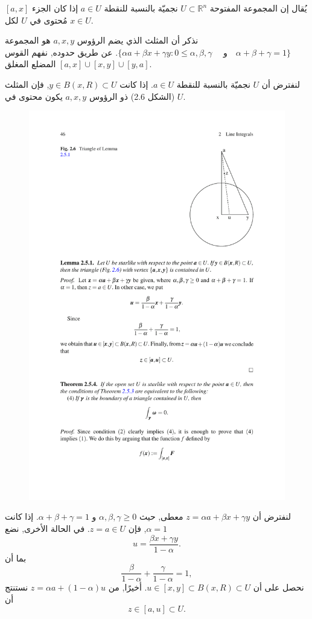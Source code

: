 \begin{definition}
يُقال إن المجموعة المفتوحة \( U \subset \mathbb{R}^n \) نجميّة بالنسبة للنقطة \( a \in U \) إذا كان الجزء \([a, x]\) مُحتوى في \( U \) لكل \( x \in U \).
\end{definition}

نذكر أن المثلث الذي يضم الرؤوس \( a, x, y \) هو المجموعة \(\{\alpha a + \beta x + \gamma y : 0 \leq \alpha, \beta, \gamma \quad\text{ و}\quad \alpha + \beta + \gamma = 1 \}\). عن طريق حدوده, نفهم القوس المضلع المغلق $[a, x] \cup  [x, y] \cup  [y, a]$.

\begin{lemma}
لنفترض أن \( U \) نجميّة بالنسبة للنقطة \( a \in U \). إذا كانت \( y \in B(x, R) \subset U \), فإن المثلث (الشكل 2.6) ذو الرؤوس \( a, x, y \) يكون محتوى في \( U \).
\end{lemma}

\begin{figure}
    \centering
    \includegraphics[width=0.5\linewidth]{Triangle_lemma.pdf}
    \caption{}
    \label{fig:enter-label}
\end{figure}

\begin{demonstration}
لنفترض أن \( z = \alpha a + \beta x + \gamma y \) معطى, حيث \( \alpha, \beta, \gamma \geq 0 \) و \(\alpha + \beta + \gamma = 1\). إذا كانت \(\alpha = 1\), فإن \( z = a \in U \). في الحالة الأخرى, نضع
\[ u = \frac{\beta x + \gamma y}{1 - \alpha}. \]
بما أن
\[ \frac{\beta}{1 - \alpha} + \frac{\gamma}{1 - \alpha} = 1, \]
نحصل على أن \( u \in [x, y] \subset B(x, R) \subset U \). أخيرًا, من \( z = \alpha a + (1 - \alpha) u \) نستنتج أن
\[ z \in [a, u] \subset U. \]
\end{demonstration}

